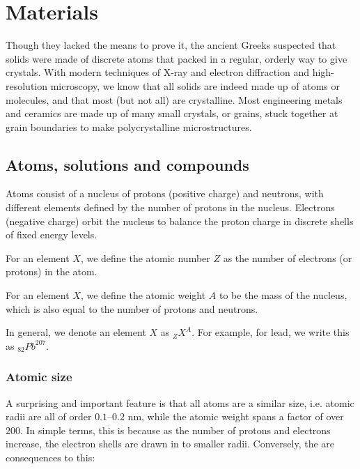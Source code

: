 \documentclass{article}
\begin{document}
\newpage

\section{Materials}

Though they lacked the means to prove it, the ancient Greeks suspected that solids were made of discrete
atoms that packed in a regular, orderly way to give crystals. With modern techniques of X-ray and
electron diffraction and high-resolution microscopy, we know that all solids are indeed made up of
atoms or molecules, and that most (but not all) are crystalline. Most engineering metals and
ceramics are made up of many small crystals, or grains, stuck together at grain boundaries to make
polycrystalline microstructures.

\subsection{Atoms, solutions and compounds}

Atoms consist of a nucleus of protons (positive charge) and neutrons, with different elements defined by the number of protons in the nucleus. Electrons (negative charge) orbit the nucleus to balance the proton charge in discrete shells of fixed energy levels. 

\begin{definition}
    For an element $X$, we define the atomic number $Z$ as the number of electrons (or protons) in the atom.
\end{definition}

\begin{definition}
    For an element $X$, we define the atomic weight $A$ to be the mass of the nucleus, which is also equal to the number of protons and neutrons.
\end{definition}

In general, we denote an element $X$ as ${}_Z X^A$. For example, for lead, we write this as ${}_{82} Pb^{207}$.

\subsubsection{Atomic size}

A surprising and important feature is that all atoms are a similar size, i.e. atomic radii are all of order
$0.1–0.2$ nm, while the atomic weight spans a factor of over $200$. In simple terms, this is because as the
number of protons and electrons increase, the electron shells are drawn in to smaller radii. Conversely, the are consequences to this:
\end{document}
